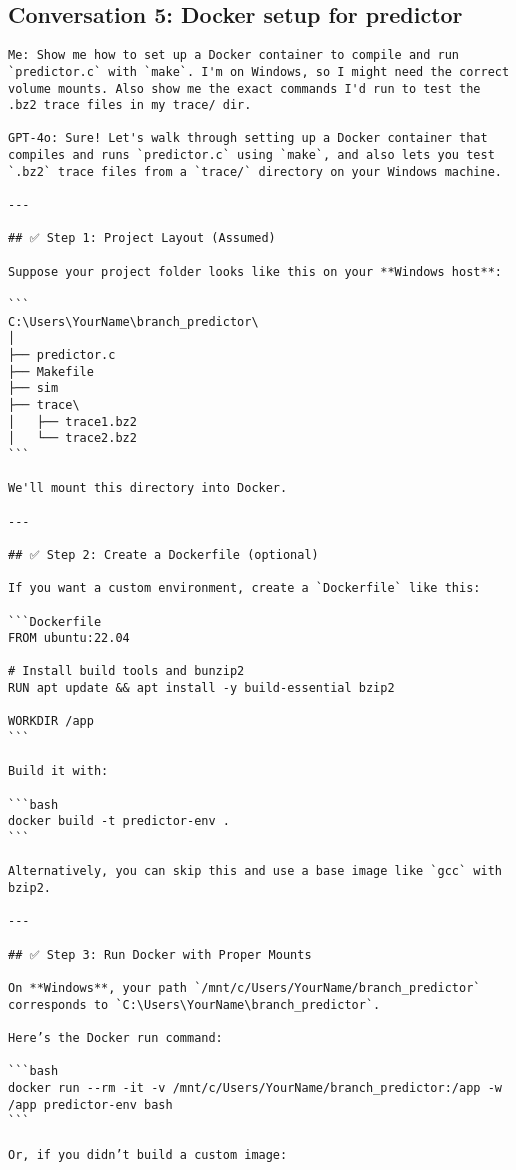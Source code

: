 \documentclass[11pt]{article}
\begin{document}
\subsection{Conversation 5: Docker setup for predictor}
\begin{Verbatim}[fontsize=\tiny, breaklines=true]
Me: Show me how to set up a Docker container to compile and run `predictor.c` with `make`. I'm on Windows, so I might need the correct volume mounts. Also show me the exact commands I'd run to test the .bz2 trace files in my trace/ dir.

GPT-4o: Sure! Let's walk through setting up a Docker container that compiles and runs `predictor.c` using `make`, and also lets you test `.bz2` trace files from a `trace/` directory on your Windows machine.

---

## ✅ Step 1: Project Layout (Assumed)

Suppose your project folder looks like this on your **Windows host**:

```
C:\Users\YourName\branch_predictor\
│
├── predictor.c
├── Makefile
├── sim
├── trace\
│   ├── trace1.bz2
│   └── trace2.bz2
```

We'll mount this directory into Docker.

---

## ✅ Step 2: Create a Dockerfile (optional)

If you want a custom environment, create a `Dockerfile` like this:

```Dockerfile
FROM ubuntu:22.04

# Install build tools and bunzip2
RUN apt update && apt install -y build-essential bzip2

WORKDIR /app
```

Build it with:

```bash
docker build -t predictor-env .
```

Alternatively, you can skip this and use a base image like `gcc` with bzip2.

---

## ✅ Step 3: Run Docker with Proper Mounts

On **Windows**, your path `/mnt/c/Users/YourName/branch_predictor` corresponds to `C:\Users\YourName\branch_predictor`.

Here’s the Docker run command:

```bash
docker run --rm -it -v /mnt/c/Users/YourName/branch_predictor:/app -w /app predictor-env bash
```

Or, if you didn’t build a custom image:


\end{Verbatim}
\end{document}

